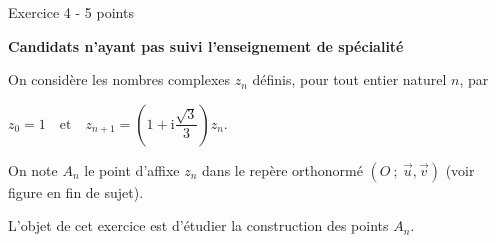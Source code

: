 
%
\begin{h2}Exercice 4 - 5 points\end{h2}
\par
\textbf{Candidats n'ayant pas suivi l'enseignement de spécialité}
\par
On considère les nombres complexes $z_n$ définis, pour tout entier naturel $n$, par
\begin{center}$z_0 = 1\quad  \text{et}\quad   z_{n+1} = \left(1+\text{i}\dfrac{\sqrt{3}}{3}\right)z_n.$\end{center}
On note $A_n$ le point d'affixe $z_n$ dans le repère orthonormé $(O~;~\vec{u},\vec{v})$ (voir figure en fin de sujet).
\par
L'objet de cet exercice est d'étudier la construction des points $A_n$.
